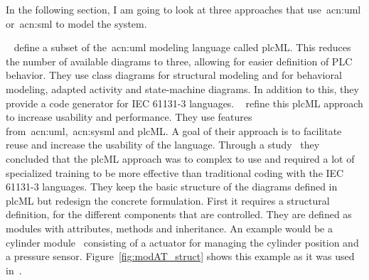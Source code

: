 In the following section, I am going to look at three approaches that use~\acrshort{acn:uml} or~\acrshort{acn:sml} to model the system.

\citeauthor{WITSCH2015}~\cite{WITSCH2015, WITSCH20117866} define a subset of the~\acrshort{acn:uml} modeling language called plcML.
This reduces the number of available diagrams to three, allowing for easier definition of PLC behavior.
They use class diagrams for structural modeling and for behavioral modeling, adapted activity and state-machine diagrams.
In addition to this, they provide a code generator for IEC 61131-3 languages.
\citeauthor{Obermeier:2015aa}~\cite{Obermeier:2015aa} refine this plcML approach to increase usability and performance.
They use features from~\acrshort{acn:uml},~\acrshort{acn:sysml} and plcML.
A goal of their approach is to facilitate reuse and increase the usability of the language.
Through a study~\cite{6315074} they concluded that the plcML approach was to complex to use and required a lot of specialized training to be more effective than traditional coding with the IEC 61131-3 languages.
They keep the basic structure of the diagrams defined in plcML but redesign the concrete formulation.
First it requires a structural definition, for the different components that are controlled.
They are defined as modules with attributes, methods and inheritance.
An example would be a cylinder module~\cite{Obermeier:2015aa} consisting of a actuator for managing the cylinder position and a pressure sensor.
Figure~\ref{fig:modAT_struct} shows this example as it was used in~\cite{Obermeier:2015aa}.
